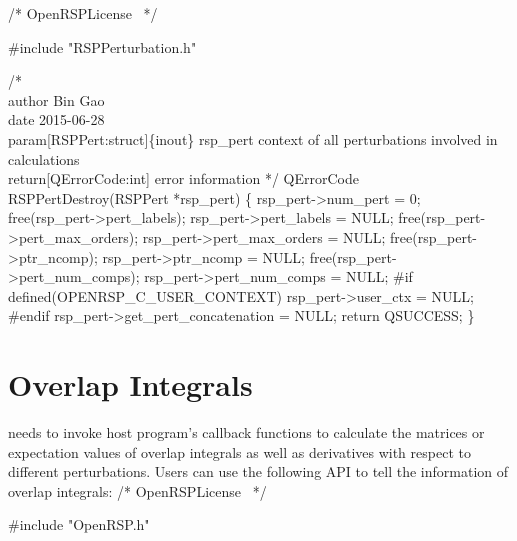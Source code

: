 \nwendcode{}\endmoddef
/*
  \LA{}OpenRSPLicense~{\nwtagstyle{}}\RA{}
*/

#include "RSPPerturbation.h"

/*%
    \\author Bin Gao
    \\date 2015-06-28
    \\param[RSPPert:struct]\{inout\} rsp_pert context of all perturbations involved in calculations
    \\return[QErrorCode:int] error information
*/
QErrorCode RSPPertDestroy(RSPPert *rsp_pert)
\{
    rsp_pert->num_pert = 0;
    free(rsp_pert->pert_labels);
    rsp_pert->pert_labels = NULL;
    free(rsp_pert->pert_max_orders);
    rsp_pert->pert_max_orders = NULL;
    free(rsp_pert->ptr_ncomp);
    rsp_pert->ptr_ncomp = NULL;
    free(rsp_pert->pert_num_comps);
    rsp_pert->pert_num_comps = NULL;
#if defined(OPENRSP_C_USER_CONTEXT)
    rsp_pert->user_ctx = NULL;
#endif
    rsp_pert->get_pert_concatenation = NULL;
    return QSUCCESS;
\}

\nwendcode{}\section{Overlap Integrals}
\label{section-OpenRSP-overlap}

\LibName needs to invoke host program's callback functions to calculate
the matrices or expectation values of overlap integrals as well as derivatives
with respect to different perturbations. Users can use the following API
to tell \LibName the information of overlap integrals:
\nwenddocs{}\endmoddef
/*
  \LA{}OpenRSPLicense~{\nwtagstyle{}}\RA{}
*/

#include "OpenRSP.h"

